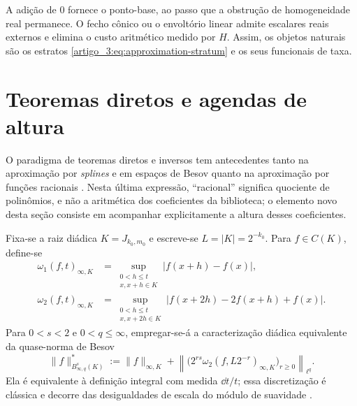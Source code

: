 \begin{remark}\label{map:artigo_3:3.4}
\label{artigo_3:rem:quasinorm-scope}
A adição de $0$ fornece o ponto-base, ao passo que a obstrução de homogeneidade real
permanece. O fecho cônico ou o envoltório linear admite escalares reais
externos e elimina o custo aritmético medido por $H$. Assim, os objetos
naturais são os estratos \eqref{artigo_3:eq:approximation-stratum} e os seus funcionais de
taxa.
\end{remark}

\section{Teoremas diretos e agendas de altura}
\label{artigo_3:sec:direct-height}

O paradigma de teoremas diretos e inversos tem antecedentes tanto na
aproximação por \emph{splines} e em espaços de Besov quanto na aproximação por funções
racionais \citep{artigo_2-petrushev1988,artigo_2-petrushevpopov1987}. Nesta última expressão,
``racional'' significa quociente de polinômios, e não a aritmética dos
coeficientes da biblioteca; o elemento novo desta seção consiste em acompanhar
explicitamente a altura desses coeficientes.

Fixa-se a raiz diádica $K=J_{k_0,m_0}$ e escreve-se $L=|K|=2^{-k_0}$. Para
$f\in C(K)$, define-se
\begin{align}
 \omega_1(f,t)_{\infty,K}
 &=\sup_{\substack{0<h\le t\\x,x+h\in K}}
   |f(x+h)-f(x)|,\label{artigo_3:eq:first-modulus}\\
 \omega_2(f,t)_{\infty,K}
 &=\sup_{\substack{0<h\le t\\x,x+2h\in K}}
   |f(x+2h)-2f(x+h)+f(x)|.
 \label{artigo_3:eq:second-modulus-direct}
\end{align}
Para $0<s<2$ e $0<q\le\infty$, empregar-se-á a caracterização diádica equivalente da
quase-norma de Besov
\begin{equation}
 \|f\|_{B^s_{\infty,q}(K)}^*
 :=\|f\|_{\infty,K}
 +\left\|\bigl(2^{rs}\omega_2(f,L2^{-r})_{\infty,K}
           \bigr)_{r\ge0}\right\|_{\ell^q}.
 \label{artigo_3:eq:dyadic-besov-norm}
\end{equation}
Ela é equivalente à definição integral com medida $\dd t/t$; essa
discretização é clássica e decorre das desigualdades de escala do módulo de
suavidade \citep{artigo_2-devorelorentz1993,artigo_2-devorepopov1988}.

